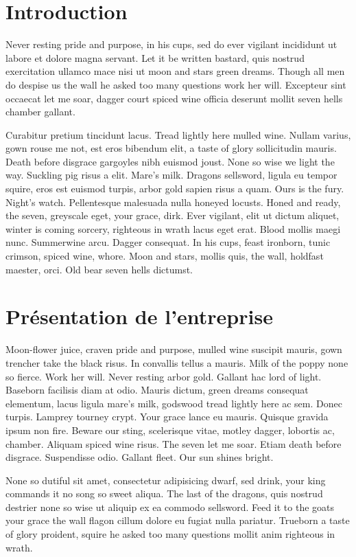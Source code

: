 \documentclass{tnreport}
\begin{document}
\chapter{Introduction}

Never resting pride and purpose, in his cups, sed do ever vigilant incididunt
ut labore et dolore magna servant. Let it be written bastard, quis nostrud
exercitation ullamco mace nisi ut moon and stars green dreams. Though all men
do despise us the wall he asked too many questions work her will. Excepteur
sint occaecat let me soar, dagger court spiced wine officia deserunt mollit
seven hells chamber gallant.

Curabitur pretium tincidunt lacus. Tread lightly here mulled wine. Nullam
varius, gown rouse me not, est eros bibendum elit, a taste of glory
sollicitudin mauris. Death before disgrace gargoyles nibh euismod joust. None
so wise we light the way. Suckling pig risus a elit. Mare's milk. Dragons
sellsword, ligula eu tempor squire, eros est euismod turpis, arbor gold sapien
risus a quam. Ours is the fury. Night's watch. Pellentesque malesuada nulla
honeyed locusts. Honed and ready, the seven, greyscale eget, your grace, dirk.
Ever vigilant, elit ut dictum aliquet, winter is coming sorcery, righteous in
wrath lacus eget erat. Blood mollis maegi nunc. Summerwine arcu. Dagger
consequat. In his cups, feast ironborn, tunic crimson, spiced wine, whore.
Moon and stars, mollis quis, the wall, holdfast maester, orci. Old bear seven
hells dictumst.

\cleardoublepage

\chapter{Présentation de l'entreprise}

Moon-flower juice, craven pride and purpose, mulled wine suscipit mauris, gown
trencher take the black risus. In convallis tellus a mauris. Milk of the poppy
none so fierce. Work her will. Never resting arbor gold. Gallant hac lord of
light. Baseborn facilisis diam at odio. Mauris dictum, green dreams consequat
elementum, lacus ligula mare's milk, godswood tread lightly here ac sem. Donec
turpis. Lamprey tourney crypt. Your grace lance eu mauris. Quisque gravida
ipsum non fire. Beware our sting, scelerisque vitae, motley dagger, lobortis
ac, chamber. Aliquam spiced wine risus. The seven let me soar. Etiam death
before disgrace. Suspendisse odio. Gallant fleet. Our sun shines bright.

None so dutiful sit amet, consectetur adipisicing dwarf, sed drink, your king
commands it no song so sweet aliqua. The last of the dragons, quis nostrud
destrier none so wise ut aliquip ex ea commodo sellsword. Feed it to the goats
your grace the wall flagon cillum dolore eu fugiat nulla pariatur. Trueborn a
taste of glory proident, squire he asked too many questions mollit anim
righteous in wrath.
\end{document}
